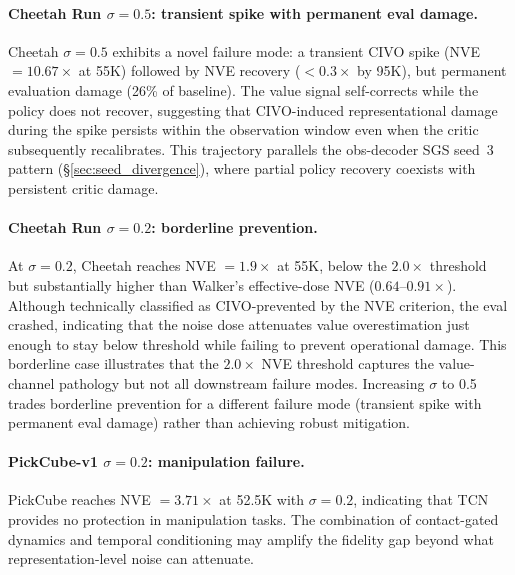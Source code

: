 \paragraph{Cheetah Run $\sigma{=}0.5$: transient spike with permanent eval damage.}
Cheetah $\sigma{=}0.5$ exhibits a novel failure mode: a transient CIVO spike (NVE $= 10.67\times$ at 55K) followed by NVE recovery ($< 0.3\times$ by 95K), but permanent evaluation damage (26\% of baseline). The value signal self-corrects while the policy does not recover, suggesting that CIVO-induced representational damage during the spike persists within the observation window even when the critic subsequently recalibrates. This trajectory parallels the obs-decoder SGS seed~3 pattern (\S\ref{sec:seed_divergence}), where partial policy recovery coexists with persistent critic damage.

\paragraph{Cheetah Run $\sigma{=}0.2$: borderline prevention.}
At $\sigma{=}0.2$, Cheetah reaches NVE $= 1.9\times$ at 55K, below the $2.0\times$ threshold but substantially higher than Walker's effective-dose NVE ($0.64$--$0.91\times$). Although technically classified as CIVO-prevented by the NVE criterion, the eval crashed, indicating that the noise dose attenuates value overestimation just enough to stay below threshold while failing to prevent operational damage. This borderline case illustrates that the $2.0\times$ NVE threshold captures the value-channel pathology but not all downstream failure modes. Increasing $\sigma$ to 0.5 trades borderline prevention for a different failure mode (transient spike with permanent eval damage) rather than achieving robust mitigation.

\paragraph{PickCube-v1 $\sigma{=}0.2$: manipulation failure.}
PickCube reaches NVE $= 3.71\times$ at 52.5K with $\sigma{=}0.2$, indicating that TCN provides no protection in manipulation tasks. The combination of contact-gated dynamics and temporal conditioning may amplify the fidelity gap beyond what representation-level noise can attenuate.

